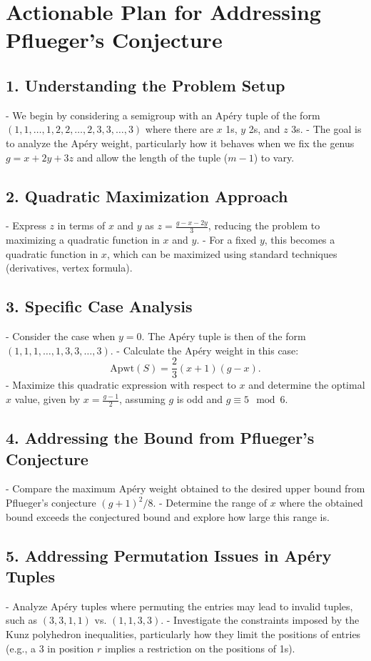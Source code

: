 \documentclass[11pt]{article}
\begin{document}
\section*{Actionable Plan for Addressing Pflueger's Conjecture}

\subsection*{1. Understanding the Problem Setup}
- We begin by considering a semigroup with an Apéry tuple of the form $(1,1,\dots,1,2,2,\dots,2,3,3,\dots,3)$ where there are $x$ 1s, $y$ 2s, and $z$ 3s.
- The goal is to analyze the Apéry weight, particularly how it behaves when we fix the genus $g = x + 2y + 3z$ and allow the length of the tuple ($m-1$) to vary.

\subsection*{2. Quadratic Maximization Approach}
- Express $z$ in terms of $x$ and $y$ as $z = \frac{g-x-2y}{3}$, reducing the problem to maximizing a quadratic function in $x$ and $y$.
- For a fixed $y$, this becomes a quadratic function in $x$, which can be maximized using standard techniques (derivatives, vertex formula).

\subsection*{3. Specific Case Analysis}
- Consider the case when $y = 0$. The Apéry tuple is then of the form $(1,1,1,\dots,1,3,3,\dots,3)$.
- Calculate the Apéry weight in this case:
  \[
  \text{Apwt}(S) = \frac{2}{3}(x+1)(g-x).
  \]
- Maximize this quadratic expression with respect to $x$ and determine the optimal $x$ value, given by $x = \frac{g-1}{2}$, assuming $g$ is odd and $g \equiv 5 \mod 6$.

\subsection*{4. Addressing the Bound from Pflueger's Conjecture}
- Compare the maximum Apéry weight obtained to the desired upper bound from Pflueger's conjecture $(g+1)^2/8$.
- Determine the range of $x$ where the obtained bound exceeds the conjectured bound and explore how large this range is.

\subsection*{5. Addressing Permutation Issues in Apéry Tuples}
- Analyze Apéry tuples where permuting the entries may lead to invalid tuples, such as $(3,3,1,1)$ vs. $(1,1,3,3)$.
- Investigate the constraints imposed by the Kunz polyhedron inequalities, particularly how they limit the positions of entries (e.g., a 3 in position $r$ implies a restriction on the positions of 1s).
\end{document}
